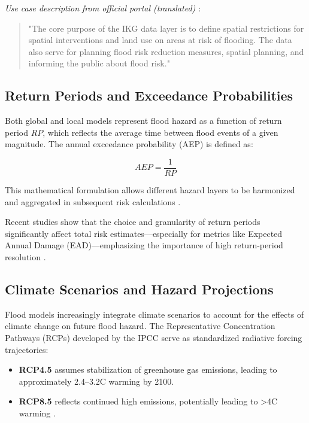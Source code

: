 \textit{Use case description from official portal (translated) \cite{si_ikg_data_2025}}:
\begin{quote}
"The core purpose of the IKG data layer is to define spatial restrictions for spatial interventions and land use on areas at risk of flooding. The data also serve for planning flood risk reduction measures, spatial planning, and informing the public about flood risk."
\end{quote}

\subsection{Return Periods and Exceedance Probabilities}

Both global and local models represent flood hazard as a function of return period \( RP \), which reflects the average time between flood events of a given magnitude. The annual exceedance probability (AEP) is defined as:

\[
AEP = \frac{1}{RP}
\]

This mathematical formulation allows different hazard layers to be harmonized and aggregated in subsequent risk calculations \cite{ward_how_2011}.

Recent studies show that the choice and granularity of return periods significantly affect total risk estimates—especially for metrics like Expected Annual Damage (EAD)—emphasizing the importance of high return-period resolution \cite{ward_how_2011}.

\subsection{Climate Scenarios and Hazard Projections}

Flood models increasingly integrate climate scenarios to account for the effects of climate change on future flood hazard. The Representative Concentration Pathways (RCPs) developed by the IPCC serve as standardized radiative forcing trajectories:

\begin{itemize}
    \item \textbf{RCP4.5} assumes stabilization of greenhouse gas emissions, leading to approximately 2.4–3.2\textdegree C warming by 2100.
    \item \textbf{RCP8.5} reflects continued high emissions, potentially leading to >4\textdegree C warming \cite{ipcc2021}.
\end{itemize}

